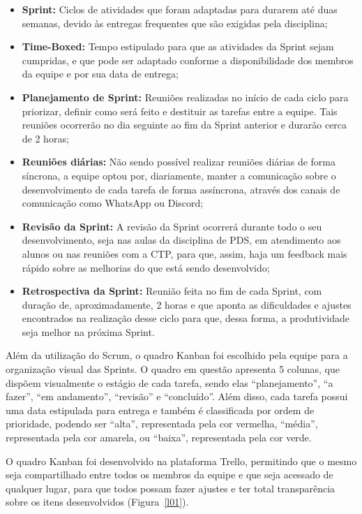 \documentclass[12pt,a4paper]{article}
\begin{document}
\begin{itemize}
    \item \textbf{Sprint:} Ciclos de atividades que foram adaptadas para durarem até duas semanas, devido às entregas frequentes que são exigidas pela disciplina;\cite{roberto}
    \item \textbf {Time-Boxed:} Tempo estipulado para que as atividades da Sprint sejam cumpridas, e que pode ser adaptado conforme a disponibilidade dos membros da equipe e por sua data de entrega;\cite{roberto}
    \item \textbf{Planejamento de Sprint:} Reuniões realizadas no início de cada ciclo para priorizar, definir como será feito e destituir as tarefas entre a equipe. Tais reuniões ocorrerão no dia seguinte ao fim da Sprint anterior e durarão cerca de 2 horas; \cite{roberto}
    \item \textbf{Reuniões diárias:} Não sendo possível realizar reuniões diárias de forma síncrona, a equipe optou por, diariamente, manter a comunicação sobre o desenvolvimento de cada tarefa de forma assíncrona, através dos canais de comunicação como WhatsApp ou Discord; \cite{roberto}
    \item \textbf{Revisão da Sprint:} A revisão da Sprint ocorrerá durante todo o seu desenvolvimento, seja nas aulas da disciplina de PDS, em atendimento aos alunos ou nas reuniões com a CTP, para que, assim, haja um feedback mais rápido sobre as melhorias do que está sendo desenvolvido; \cite{roberto}
    \item \textbf{Retrospectiva da Sprint:} Reunião feita no fim de cada Sprint, com duração de, aproximadamente, 2 horas e que aponta as dificuldades e ajustes encontrados na realização desse ciclo para que, dessa forma, a produtividade seja melhor na próxima Sprint. \cite{roberto}
\end{itemize}

Além da utilização do \gls{Scrum}, o quadro \gls{Kanban} foi escolhido pela equipe para a organização visual das \gls{Sprints}. O quadro em questão apresenta 5 colunas, que dispõem visualmente o estágio de cada tarefa, sendo elas “planejamento”, “a fazer”, “em andamento”, “revisão” e “concluído”. Além disso, cada tarefa possui uma data estipulada para entrega e também é classificada por ordem de prioridade, podendo ser “alta”, representada pela cor vermelha, “média”, representada pela cor amarela, ou “baixa”, representada pela cor verde. \cite{asana}

O quadro \gls{Kanban} foi desenvolvido na plataforma \gls{Trello}, permitindo que o mesmo seja compartilhado entre todos os membros da equipe e que seja acessado de qualquer lugar, para que todos possam fazer ajustes e ter total transparência sobre os itens desenvolvidos (Figura~\ref{l01}).
\end{document}
